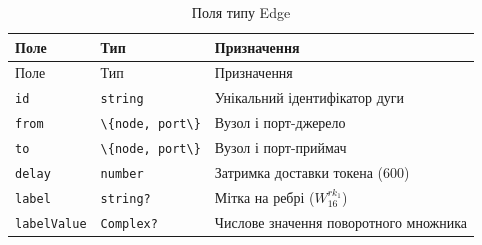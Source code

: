 \documentclass[
]{article}
\newcommand{\passthrough}[1]{#1}
\begin{document}
\begin{longtable}[]{@{}
  >{\raggedright\arraybackslash}p{}
  >{\raggedright\arraybackslash}p{}
  >{\raggedright\arraybackslash}p{}@{}}
\caption[Поля типу Edge]{Поля типу Edge}\tabularnewline
\toprule\noalign{}
\begin{minipage}[b]{\linewidth}\raggedright
Поле
\end{minipage} & \begin{minipage}[b]{\linewidth}\raggedright
Тип
\end{minipage} & \begin{minipage}[b]{\linewidth}\raggedright
Призначення
\end{minipage} \\
\midrule\noalign{}
\endfirsthead
\toprule\noalign{}
\begin{minipage}[b]{\linewidth}\raggedright
Поле
\end{minipage} & \begin{minipage}[b]{\linewidth}\raggedright
Тип
\end{minipage} & \begin{minipage}[b]{\linewidth}\raggedright
Призначення
\end{minipage} \\
\midrule\noalign{}
\endhead
\bottomrule\noalign{}
\endlastfoot
\passthrough{\lstinline!id!} & \passthrough{\lstinline!string!} &
Унікальний ідентифікатор дуги \\
\passthrough{\lstinline!from!} &
\passthrough{\lstinline!\{node,!}\passthrough{\lstinline! !}\passthrough{\lstinline!port\}!}
& Вузол і порт-джерело \\
\passthrough{\lstinline!to!} &
\passthrough{\lstinline!\{node,!}\passthrough{\lstinline! !}\passthrough{\lstinline!port\}!}
& Вузол і порт-приймач \\
\passthrough{\lstinline!delay!} & \passthrough{\lstinline!number!} &
Затримка доставки токена (600) \\
\passthrough{\lstinline!label!} & \passthrough{\lstinline!string?!} &
Мітка на ребрі (\(W_{16}^{rk_{1}}\)) \\
\passthrough{\lstinline!labelValue!} &
\passthrough{\lstinline!Complex?!} & Числове значення поворотного
множника \\
\end{longtable}
\end{document}
